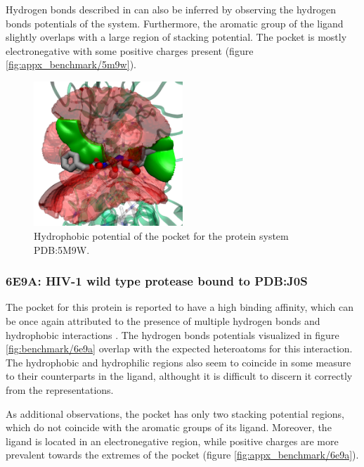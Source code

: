       Hydrogen bonds described in \cite{hydrophobic_2017} can also be inferred by observing the hydrogen bonds potentials of the system. Furthermore, the aromatic group of the ligand slightly overlaps with a large region of stacking potential. The pocket is mostly electronegative with some positive charges present (figure \ref{fig:appx_benchmark/5m9w}).

      \begin{figure}[H]
        \centering
        \includegraphics[width=0.5\textwidth]{figures/results/benchmark_prot/5m9w.png}
        \caption{\label{fig:benchmark/5m9w} Hydrophobic potential of the pocket for the protein system PDB:5M9W.}
      \end{figure}
    \pagebreak

    \subsubsection{6E9A: HIV-1 wild type protease bound to PDB:J0S}
      The pocket for this protein is reported to have a high binding affinity, which can be once again attributed to the presence of multiple hydrogen bonds and hydrophobic interactions \cite{benchmark_6e9a_2018}. The hydrogen bonds potentials visualized in figure \ref{fig:benchmark/6e9a} overlap with the expected heteroatoms for this interaction. The hydrophobic and hydrophilic regions also seem to coincide in some measure to their counterparts in the ligand, althought it is difficult to discern it correctly from the representations.

      As additional observations, the pocket has only two stacking potential regions, which do not coincide with the aromatic groups of its ligand. Moreover, the ligand is located in an electronegative region, while positive charges are more prevalent towards the extremes of the pocket (figure \ref{fig:appx_benchmark/6e9a}).

